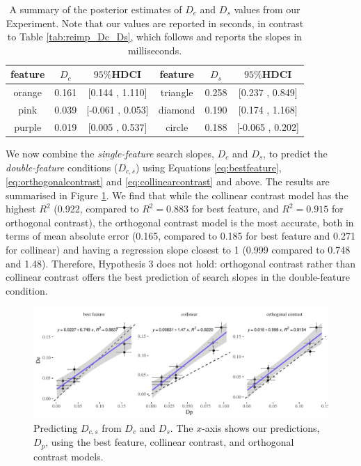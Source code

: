 \documentclass[preprint,12pt,authoryear]{elsarticle}
\begin{document}
\begin{table}[h]
\centering
\begin{tabular}{|c|cc||c|cc|} 
\hline
feature & $D_c$ & $95\%$HDCI &feature &$D_s$  &$95\%$HDCI \\
 \hline 
orange & 0.161 &  [0.144 ,  1.110] & triangle  &  0.258  & [0.237  , 0.849]\\
pink  &  0.039 &  [-0.061 , 0.053] & diamond& 0.190 &  [0.174 ,  1.168]\\
purple & 0.019 &  [0.005  , 0.537] & circle & 0.188  & [-0.065 , 0.202]\\
 \hline 
 \end{tabular}
\caption{A summary of the posterior estimates of $D_c$ and $D_s$ values from our Experiment. Note that our values are reported in seconds, in contrast to Table  \ref{tab:reimp_Dc_Ds}, which follows \citep{buetti2019predicting} and reports the slopes in milliseconds.}
\label{tab:new_Dc_Ds}
\end{table}

We now combine the \textit{single-feature} search slopes, $D_c$ and $D_s$, to predict the \textit{double-feature} conditions ($D_{c,s}$) using Equations \ref{eq:bestfeature},  \ref{eq:orthogonalcontrast} and \ref{eq:collinearcontrast} and above. The results are summarised in Figure \ref{fig:new:Dpe}. We find that while the collinear contrast model has the highest $R^2$ (0.922, compared to $R^2=0.883$ for best feature, and $R^2=0.915$ for orthogonal contrast), the orthogonal contrast model is the most accurate, both in terms of mean absolute error (0.165, compared to 0.185 for best feature and 0.271 for collinear) and having a regression slope closest to 1 (0.999 compared to 0.748 and 1.48). Therefore, Hypothesis 3 does not hold: orthogonal contrast rather than collinear contrast offers the best prediction of search slopes in the double-feature condition.  

\begin{figure}[ht]
\centering
\includegraphics[width=\textwidth]{../plots/Dpe.pdf}
\caption{Predicting $D_{c,s}$ from $D_c$ and $D_s$. The $x$-axis shows our predictions, $D_p$, using the best feature, collinear contrast, and orthogonal contrast models.}
\label{fig:new:Dpe}
\end{figure}
\end{document}
